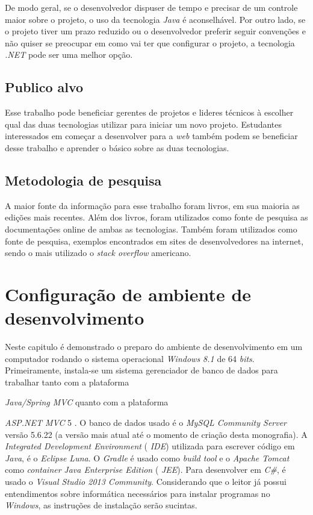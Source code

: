 \documentclass[a4paper,12pt]{article}
\newcommand{\anmvc} {
\sigla{ASP.NET MVC} 5
}
\newcommand{\spring} {
\est{Java/Spring MVC}
}
\newcommand{\est}[1] {
\textit{#1}}
\newcommand{\sigla}[1] {
\textit{#1}}
\newcommand{\lang}[1] {
\textit{#1}}
\newcommand{\lib}[1] {
\textit{#1}}
\begin{document}
De modo geral, se o desenvolvedor dispuser de tempo e precisar de um controle maior sobre o projeto, o uso da tecnologia \lang{Java} é aconselhável. Por outro lado, se o projeto tiver um prazo reduzido ou o desenvolvedor preferir seguir convenções e não quiser se preocupar em como vai ter que configurar o projeto, a tecnologia \lib{.NET} pode ser uma melhor opção.
 
\subsection{Publico alvo}

Esse trabalho pode beneficiar gerentes de projetos e lideres técnicos à escolher qual das duas tecnologias utilizar para iniciar um novo projeto. Estudantes interessados em começar a desenvolver para a \est{web} também podem se beneficiar desse trabalho e aprender o básico sobre as duas tecnologias.

\subsection{Metodologia de pesquisa}

A maior fonte da informação para esse trabalho foram livros, em sua maioria as edições mais recentes. Além dos livros, foram utilizados como fonte de pesquisa as documentações online de ambas as tecnologias. Também foram utilizados como fonte de pesquisa, exemplos encontrados em sites de desenvolvedores na internet, sendo o mais utilizado o \est{stack overflow} americano.

\newpage
\section{Configuração de ambiente de desenvolvimento}

Neste capitulo é demonstrado o preparo do ambiente de desenvolvimento em um computador rodando o sistema operacional \est{Windows 8.1} de 64 \est{bits}. Primeiramente, instala-se um sistema gerenciador de banco de dados para trabalhar tanto com a plataforma \spring quanto com a plataforma \anmvc.  O banco de dados usado é o \est{MySQL Community Server} versão 5.6.22 (a versão mais atual até o momento de criação desta monografia). A \est{Integrated Development Environment} (\sigla{IDE}) utilizada  para escrever código em \lang{Java}, é o \est{Eclipse Luna}. O \est{Gradle} é usado como \est{build tool} e o \est{Apache Tomcat} como \est{container} \est{Java Enterprise Edition} (\sigla{JEE}). Para desenvolver em \lang{C\#}, é usado o \est{Visual Studio 2013 Community}. Considerando que o leitor já possui entendimentos sobre informática necessários para instalar programas no \est{Windows}, as instruções de instalação serão sucintas. 
\end{document}
